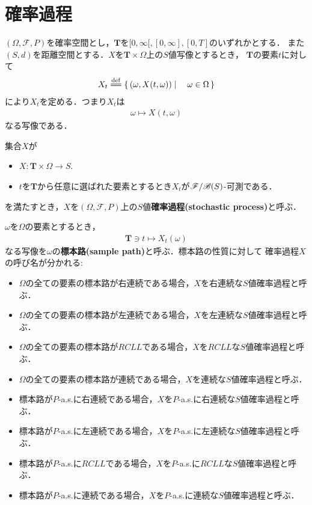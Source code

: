 \section{確率過程}
	$(\Omega,\mathscr{F},P)$を確率空間とし，$\mathbf{T}$を$[0,\infty[,[0,\infty],[0,T]$のいずれかとする．
	また$(S,d)$を距離空間とする．$X$を$\mathbf{T} \times \Omega$上の$S$値写像とするとき，
	$\mathbf{T}$の要素$t$に対して
	\begin{align}
		X_t \defeq \Set{(\omega,X(t,\omega))}{\omega \in \Omega}
	\end{align}
	により$X_t$を定める．つまり$X_t$は
	\begin{align}
		\omega \longmapsto X(t,\omega)
	\end{align}
	なる写像である．
	
	\begin{screen}
		\begin{dfn}[確率過程]
			集合$X$が
			\begin{itemize}
				\item $X:\mathbf{T} \times \Omega \longrightarrow S$.
				\item $t$を$\mathbf{T}$から任意に選ばれた要素とするとき$X_t$が$\mathscr{F}/\mathscr{B}(S)$-可測である．
			\end{itemize}
			を満たすとき，$X$を$(\Omega,\mathscr{F},P)$上の$S$値{\bf 確率過程}{\bf (stochastic process)}と呼ぶ．
		\end{dfn}
	\end{screen}
	
	$\omega$を$\Omega$の要素とするとき，
	\begin{align}
		\mathbf{T} \ni t \longmapsto X_t(\omega)
	\end{align}
	なる写像を$\omega$の{\bf 標本路}{\bf (sample path)}と呼ぶ．標本路の性質に対して
	確率過程$X$の呼び名が分かれる:
	\begin{itemize}
		\item $\Omega$の全ての要素の標本路が右連続である場合，$X$を右連続な$S$値確率過程と呼ぶ．
		\item $\Omega$の全ての要素の標本路が左連続である場合，$X$を左連続な$S$値確率過程と呼ぶ．
		\item $\Omega$の全ての要素の標本路が$RCLL$である場合，$X$を$RCLL$な$S$値確率過程と呼ぶ．
		\item $\Omega$の全ての要素の標本路が連続である場合，$X$を連続な$S$値確率過程と呼ぶ．
		\item 標本路が$P$-a.s.に右連続である場合，$X$を$P$-a.s.に右連続な$S$値確率過程と呼ぶ．
		\item 標本路が$P$-a.s.に左連続である場合，$X$を$P$-a.s.に左連続な$S$値確率過程と呼ぶ．
		\item 標本路が$P$-a.s.に$RCLL$である場合，$X$を$P$-a.s.に$RCLL$な$S$値確率過程と呼ぶ．
		\item 標本路が$P$-a.s.に連続である場合，$X$を$P$-a.s.に連続な$S$値確率過程と呼ぶ．
	\end{itemize}
	
